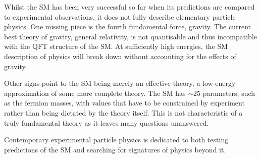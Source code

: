 
Whilst the \ac{SM} has been very successful so far when its predictions are
compared to experimental observations, it does not fully describe elementary
particle physics. One missing piece is the fourth fundamental force, gravity.
The current best theory of gravity, general relativity, is not quantisable and
thus incompatible with the \ac{QFT} structure of the \ac{SM}. At sufficiently
high energies, the \ac{SM} description of physics will break down without
accounting for the effects of gravity. 

Other signs point to the \ac{SM} being merely an effective theory, a low-energy
approximation of some more complete theory. The \ac{SM} has $\sim25$ parameters,
such as the fermion masses, with values that have to be constrained by
experiment rather than being dictated by the theory itself. This is not
characteristic of a truly fundamental theory as it leaves many questions
unanswered.

Contemporary experimental particle physics is dedicated to both testing
predictions of the \ac{SM} and searching for signatures of physics beyond it.


